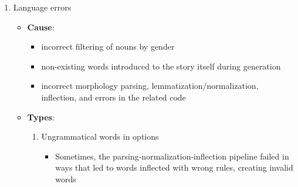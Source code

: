 \begin{enumerate}
\begin{itemize}
\begin{enumerate}
\begin{itemize}
        \begin{itemize}
        \tightlist
        \item
          In Ukrainian, reflexive verbs ending in "-ся" \emph{(-sja)}
          before certain consonants can have the ending shortened into
          "-сь" \emph{(-s\textquotesingle)}, while remaining the exact
          same verb
        \end{itemize}
      \item
        Note that if there are two different characters, e.g. the large
        Bird and the small Birdie, then these words would refer to
        different characters and this error won\textquotesingle t apply.
      \item
        Differs from "multiple options are correct" by the fact that
        here it\textquotesingle s not different facets of the same
        entity (sewing is a \emph{type of} work), but they are
        \emph{exactly} the same entity.
      \end{itemize}
    \end{enumerate}
  \end{itemize}
\item
  Language errors

  \begin{itemize}
  \tightlist
  \item
    \textbf{Cause}:

    \begin{itemize}
    \tightlist
    \item
      incorrect filtering of nouns by gender
    \item
      non-existing words introduced to the story itself during
      generation
    \item
      incorrect morphology parsing, lemmatization/normalization,
      inflection, and errors in the related code
    \end{itemize}
  \item
    \textbf{Types}:

    \begin{enumerate}
    \def\labelenumii{\arabic{enumii}.}
    \tightlist
    \item
      Ungrammatical words in options

      \begin{itemize}
      \tightlist
      \item
        Sometimes, the parsing-normalization-inflection pipeline failed
        in ways that led to words inflected with wrong rules, creating
        invalid words


\end{itemize}
\end{enumerate}
\end{itemize}
\end{enumerate}
